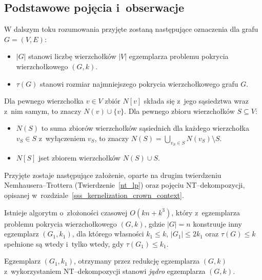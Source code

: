 \subsection{Podstawowe pojęcia i~obserwacje}\label{ss_ckx_preliminaries}
\par{
  W dalszym toku rozumowania przyjęte zostaną następujące oznaczenia dla grafu $G=(V, E)$:
  \begin{itemize}
    \item $|G|$ stanowi liczbę wierzchołków $|V|$ egzemplarza problemu pokrycia wierzchołkowego $(G, k)$.
    \item $\tau(G)$ stanowi rozmiar najmniejszego pokrycia wierzchołkowego grafu $G$.
  \end{itemize}
  Dla pewnego wierzchołka $v \in V$ zbiór $N[v]$ składa się z~jego sąsiedztwa wraz z~nim samym, to znaczy $N(v) \cup \{v\}$.
  Dla pewnego zbioru wierzchołków $S \subseteq V$:
  \begin{itemize}
    \item $N(S)$ to suma zbiorów wierzchołków sąsiednich dla każdego wierzchołka $v_S \in S$ z~wyłączeniem $v_S$, to znaczy $N(S)=\bigcup_{v_S\in S}N(v_S) \setminus S$.
    \item $N[S]$ jset zbiorem wierzchołków $N(S) \cup S$.
  \end{itemize}

  Przyjęte zostaje następujące założenie, oparte na drugim twierdzeniu Nemhausera--Trottera (Twierdzenie~\ref{nt_lp}) oraz pojęciu NT--dekompozycji, opisanej w~rozdziale~\ref{sss_kernelization_crown_context}.
  \begin{proposition}
    Istnieje algorytm o~złożoności czasowej $O(kn + k^3)$, który z~egzemplarza problemu pokrycia wierzchołkowego $(G, k)$, gdzie $|G|=n$ konstruuje inny egzemplarz $(G_1, k_1)$, dla którego własności $k_1 \leq k$, $|G_1| \leq 2k_1$ oraz $\tau(G) \leq k$ spełnione są wtedy i~tylko wtedy, gdy $\tau(G_1) \leq k_1$.
  \end{proposition}

  \begin{definition}
    Egzemplarz $(G_1, k_1)$, otrzymany przez redukcję egzemplarza $(G, k)$ z~wykorzystaniem NT--dekompozycji stanowi \emph{jądro} egzemplarza $(G, k)$.
  \end{definition}
}
